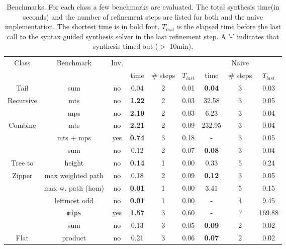 \begin{table}
	\caption{Benchmarks.            For each class a few benchmarks are evaluated.
            The total synthesis time(in seconds) and the number of refinement steps are listed for both {\tool} and the naive implementation.
            The shortest time is in bold font.            $T_{last}$ is the elapsed time before the last call to the syntax guided synthesis solver in the last refinement step.
             A '-' indicates that synthesis timed out ($>$ 10min).}\label{table:experiments}
	{
		\begin{tabular}[h]{|c|c|c|c|c|c||c|c|c|}
			\hline
			 \multirow{2}{*}{Class} & \multirow{2}{*}{Benchmark}  & \multirow{2}{*}{Inv.} & \multicolumn{3}{c||}{\tool} & \multicolumn{3}{c|}{Naive}\\ 
			\cline{4-9}
			 &   & & time & \# steps & $T_{last}$ & time & \# steps & $T_{last}$\\ 
			\hline
			Tail & sum & no & 0.04 & 2 & 0.01 & {\bfseries 0.04} & 3 & 0.03\\ 
			Recursive & mts & no & {\bfseries 1.22} & 2 & 0.03 & 32.58 & 3 & 0.05\\ 
			 & mps & no & {\bfseries 2.19} & 2 & 0.03 & 6.23 & 3 & 0.04\\ 
			\hline
			Combine & mts & no & {\bfseries 2.21} & 2 & 0.09 & 232.95 & 3 & 0.04\\ 
			 & mts + mps & yes & {\bfseries 0.74} & 3 & 0.18 & - & 3 & 0.05\\ 
			\hline
			 & sum & no & 0.12 & 2 & 0.07 & {\bfseries 0.08} & 3 & 0.04\\ 
			Tree to & height & no & {\bfseries 0.14} & 1 & 0.00 & 0.33 & 5 & 0.24\\ 
			Zipper & max weighted path & no & 0.18 & 2 & 0.09 & {\bfseries 0.12} & 3 & 0.05\\ 
			 & max w. path (hom) & no & {\bfseries 0.01} & 1 & 0.00 & 3.41 & 5 & 0.15\\ 
			 & leftmost odd & no & {\bfseries 0.01} & 1 & 0.00 & - & 4 & 9.45\\ 
			 & {\tt mips} & yes & {\bfseries 1.57} & 3 & 0.60 & - & 7 & 169.88\\ 
			\hline
			 & sum & no & 0.13 & 3 & 0.05 & {\bfseries 0.09} & 2 & 0.02\\ 
			Flat & product & no & 0.21 & 3 & 0.06 & {\bfseries 0.07} & 2 & 0.02\\ 

\end{tabular}}
\end{table}
